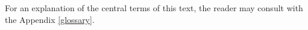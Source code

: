 For an explanation of the central terms of this text, the reader may consult with the Appendix \ref{glossary}.





